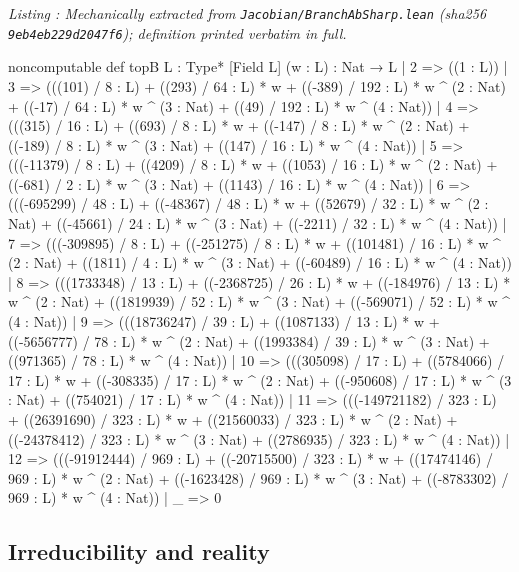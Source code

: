 \documentclass[a4paper,11pt]{article}
\newcounter{leanlisting}
\newenvironment{leanlisting}[2]{%
  \refstepcounter{leanlisting}\label{#2}%
  \begin{center}\textit{\small Listing \theleanlisting: #1}\end{center}%
  \Verbatim[breaklines=true,breakanywhere=true,fontsize=\footnotesize,frame=single,framesep=4pt,rulecolor=\color{gray!50},fillcolor=\color{gray!5}]%
}{%
  \endVerbatim%
}
\theoremstyle{plain}
\theoremstyle{definition}
\theoremstyle{remark}
\begin{document}
\begin{leanlisting}{Mechanically extracted from \texttt{Jacobian/BranchAbSharp.lean} (sha256 \texttt{9eb4eb229d2047f6}); definition printed verbatim in full.}{lst:def-topb}
noncomputable def topB {L : Type*} [Field L] (w : L) : Nat → L
  | 2 => ((1 : L))
  | 3 => (((101) / 8 : L) + ((293) / 64 : L) * w + ((-389) / 192 : L) * w ^ (2 : Nat) + ((-17) / 64 : L) * w ^ (3 : Nat) + ((49) / 192 : L) * w ^ (4 : Nat))
  | 4 => (((315) / 16 : L) + ((693) / 8 : L) * w + ((-147) / 8 : L) * w ^ (2 : Nat) + ((-189) / 8 : L) * w ^ (3 : Nat) + ((147) / 16 : L) * w ^ (4 : Nat))
  | 5 => (((-11379) / 8 : L) + ((4209) / 8 : L) * w + ((1053) / 16 : L) * w ^ (2 : Nat) + ((-681) / 2 : L) * w ^ (3 : Nat) + ((1143) / 16 : L) * w ^ (4 : Nat))
  | 6 => (((-695299) / 48 : L) + ((-48367) / 48 : L) * w + ((52679) / 32 : L) * w ^ (2 : Nat) + ((-45661) / 24 : L) * w ^ (3 : Nat) + ((-2211) / 32 : L) * w ^ (4 : Nat))
  | 7 => (((-309895) / 8 : L) + ((-251275) / 8 : L) * w + ((101481) / 16 : L) * w ^ (2 : Nat) + ((1811) / 4 : L) * w ^ (3 : Nat) + ((-60489) / 16 : L) * w ^ (4 : Nat))
  | 8 => (((1733348) / 13 : L) + ((-2368725) / 26 : L) * w + ((-184976) / 13 : L) * w ^ (2 : Nat) + ((1819939) / 52 : L) * w ^ (3 : Nat) + ((-569071) / 52 : L) * w ^ (4 : Nat))
  | 9 => (((18736247) / 39 : L) + ((1087133) / 13 : L) * w + ((-5656777) / 78 : L) * w ^ (2 : Nat) + ((1993384) / 39 : L) * w ^ (3 : Nat) + ((971365) / 78 : L) * w ^ (4 : Nat))
  | 10 => (((305098) / 17 : L) + ((5784066) / 17 : L) * w + ((-308335) / 17 : L) * w ^ (2 : Nat) + ((-950608) / 17 : L) * w ^ (3 : Nat) + ((754021) / 17 : L) * w ^ (4 : Nat))
  | 11 => (((-149721182) / 323 : L) + ((26391690) / 323 : L) * w + ((21560033) / 323 : L) * w ^ (2 : Nat) + ((-24378412) / 323 : L) * w ^ (3 : Nat) + ((2786935) / 323 : L) * w ^ (4 : Nat))
  | 12 => (((-91912444) / 969 : L) + ((-20715500) / 323 : L) * w + ((17474146) / 969 : L) * w ^ (2 : Nat) + ((-1623428) / 969 : L) * w ^ (3 : Nat) + ((-8783302) / 969 : L) * w ^ (4 : Nat))
  | _ => 0
\end{leanlisting}

\subsection{Irreducibility and reality}
\end{document}
